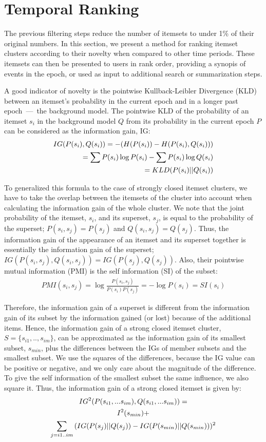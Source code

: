 \documentclass{sig-alternate}
\begin{document}
\section{Temporal Ranking}
\label{sec:rank}
The previous filtering steps reduce the number of itemsets to under 1\% of their
original numbers.
In this section, we present a method for ranking itemset clusters according to
their novelty when compared to other time periods.
These itemsets can then be presented to users in rank order, providing a
synopis of events in the epoch, or used as input to additional search or
summarization steps.

A good indicator of novelty is the pointwise Kullback-Leibler Divergence (KLD)
between an itemset's probability in the current epoch and in a longer past
epoch~---~the background model.
The pointwise KLD of the probability of an itemset $s_i$ in the background
model $Q$ from its probability in the current epoch $P$ can be considered as
the information gain, IG: 
\begin{align}IG(P(s_i),Q(s_i))  = - (H(P(s_i)) - H(P(s_i),Q(s_i))) \notag\\ = \sum{P(s_i) \log{P(s_i)}} - \sum{P(s_i) \log{Q(s_i)}} \notag\\ = KLD(P(s_i)||Q(s_i))\end{align}

To generalized this formula to the case of strongly closed itemset clusters,
we have to take the overlap between the itemsets of the cluster into account
when calculating the information gain of the whole cluster.
We note that the joint probability of the itemset, $s_i$, and its superset,
$s_j$, is equal to the probability of the superset;
$P(s_i,s_j) = P(s_j)$ and $Q(s_i,s_j) = Q(s_j)$. 
Thus, the information gain of the appearance of an itemset and its superset
together is essentially the information gain of the superset;
$IG(P(s_i,s_j),Q(s_i,s_j)) = IG(P(s_j),Q(s_j))$.
Also, their pointwise mutual information (PMI) is the self information (SI) of
the subset:
\begin{align}
PMI(s_i, s_j) = \log{ \frac{P(s_i,s_j)}{P(s_i)P(s_j)} } = -\log{P(s_i)} = SI(s_i)
\end{align}

Therefore, the information gain of a superset is different from the
information gain of its subset by the information gained (or lost) because
of the additional items.
Hence, the information gain of a strong closed itemset cluster,
$S=\{s_{i1},..,s_{im}\}$, 
can be approximated as the information gain of its smallest subset, $s_{min}$,
plus the differences between the IGs of member subsets and the smallest subset.
We use the squares of the differences, because the IG value can be positive or
negative, and we only care about the magnitude of the difference.
To give the self information of the smallest subset the same influence,
we also square it.
Thus, the information gain of a strong closed itemset is given by:
\begin{multline}IG^2(P(s_{i1},...s_{im}),Q(s_{i1},...s_{im})) =\notag\\ I^2(s_{min}) + \notag\\ 
\sum_{j = i1..im}{(IG(P(s_j)||Q(s_j)) - IG(P(s_{min})||Q(s_{min})))^{2}} \end{multline}
\end{document}
